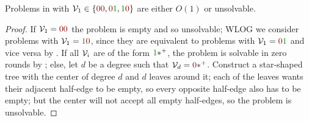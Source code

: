 \documentclass[12pt,a4paper]{article}
\begin{document}
\begin{lem}\label{lem:edgesel}
    Problems in  with $\Vc_1\in\Set{\n\n,\n\y,\y\n}$ are either $O(1)$ or unsolvable.
\end{lem}
\begin{proof}
    If $\Vc_1=\n\n$ the problem is empty and so unsolvable; WLOG we consider problems with $\Vc_1=\y\n$, since they are equivalent to problems with $\Vc_1=\n\y$ and vice versa by . If all $\mathcal{V}_i$ are of the form $\y\xpl$, the problem is solvable in zero rounds by ; else, let $d$ be a degree such that $\Vc_d=\n\xpl$. Construct a star-shaped tree with the center of degree $d$ and $d$ leaves around it; each of the leaves wants their adjacent half-edge to be empty, so every opposite half-edge also has to be empty; but the center will not accept all empty half-edges, so the problem is unsolvable.
\end{proof}
\end{document}
